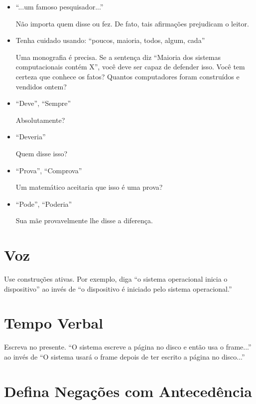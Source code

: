 \begin{itemize}
	\item ``...um famoso pesquisador...''

		\indent N\~{a}o importa quem disse ou fez. De fato, tais afirma\c{c}\~{o}es prejudicam o leitor.
		
	\item Tenha cuidado usando: ``poucos, maioria, todos, algum, cada'' 

		\indent Uma monografia \'{e} precisa. Se a senten\c{c}a diz ``Maioria dos sistemas computacionais cont\'{e}m X'', você deve ser capaz de defender isso. Você tem certeza que conhece os fatos? Quantos computadores foram constru\'{i}dos e vendidos ontem?
		
	\item ``Deve'', ``Sempre''

		\indent Absolutamente?
		
	\item ``Deveria''

		\indent Quem disse isso?
		
	\item ``Prova'', ``Comprova''

		\indent Um matem\'{a}tico aceitaria que isso \'{e} uma prova?

	\item ``Pode'', ``Poderia''

		\indent Sua m\~{a}e provavelmente lhe disse a diferen\c{c}a.

\end{itemize}

\section{Voz}

Use constru\c{c}\~{o}es ativas. Por exemplo, diga ``o sistema operacional inicia o dispositivo'' ao inv\'{e}s de ``o dispositivo \'{e} iniciado pelo sistema operacional.''

\section{Tempo Verbal}

Escreva no presente. ``O sistema escreve a p\'{a}gina no disco e ent\~{a}o usa o frame...'' ao inv\'{e}s de ``O sistema usar\'{a} o frame depois de ter escrito a p\'{a}gina no disco...''

\section{Defina Nega\c{c}\~{o}es com Antecedência}


